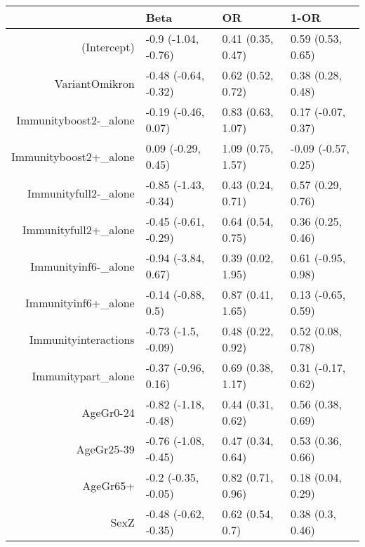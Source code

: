 \begin{table}[ht]
\centering
\begin{tabular}{rlll}
  \hline
 & Beta & OR & 1-OR \\ 
  \hline
(Intercept) & -0.9 (-1.04, -0.76) & 0.41 (0.35, 0.47) & 0.59 (0.53, 0.65) \\ 
  VariantOmikron & -0.48 (-0.64, -0.32) & 0.62 (0.52, 0.72) & 0.38 (0.28, 0.48) \\ 
  Immunityboost2-\_alone & -0.19 (-0.46, 0.07) & 0.83 (0.63, 1.07) & 0.17 (-0.07, 0.37) \\ 
  Immunityboost2+\_alone & 0.09 (-0.29, 0.45) & 1.09 (0.75, 1.57) & -0.09 (-0.57, 0.25) \\ 
  Immunityfull2-\_alone & -0.85 (-1.43, -0.34) & 0.43 (0.24, 0.71) & 0.57 (0.29, 0.76) \\ 
  Immunityfull2+\_alone & -0.45 (-0.61, -0.29) & 0.64 (0.54, 0.75) & 0.36 (0.25, 0.46) \\ 
  Immunityinf6-\_alone & -0.94 (-3.84, 0.67) & 0.39 (0.02, 1.95) & 0.61 (-0.95, 0.98) \\ 
  Immunityinf6+\_alone & -0.14 (-0.88, 0.5) & 0.87 (0.41, 1.65) & 0.13 (-0.65, 0.59) \\ 
  Immunityinteractions & -0.73 (-1.5, -0.09) & 0.48 (0.22, 0.92) & 0.52 (0.08, 0.78) \\ 
  Immunitypart\_alone & -0.37 (-0.96, 0.16) & 0.69 (0.38, 1.17) & 0.31 (-0.17, 0.62) \\ 
  AgeGr0-24 & -0.82 (-1.18, -0.48) & 0.44 (0.31, 0.62) & 0.56 (0.38, 0.69) \\ 
  AgeGr25-39 & -0.76 (-1.08, -0.45) & 0.47 (0.34, 0.64) & 0.53 (0.36, 0.66) \\ 
  AgeGr65+ & -0.2 (-0.35, -0.05) & 0.82 (0.71, 0.96) & 0.18 (0.04, 0.29) \\ 
  SexZ & -0.48 (-0.62, -0.35) & 0.62 (0.54, 0.7) & 0.38 (0.3, 0.46) \\ 
   \hline
\end{tabular}
\end{table}
